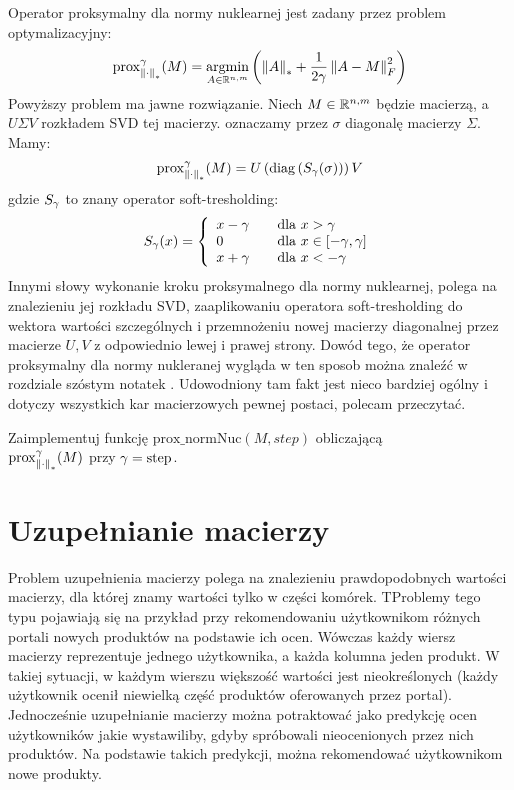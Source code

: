 \documentclass[10pt,a4paper,draft]{report}
\begin{document}
Operator proksymalny dla normy nuklearnej jest zadany przez problem optymalizacyjny:
\[
\prox_{\normNuc{\cdot}}^{\step}(M) = \argminl\limits_{A \in \rset^{n,m}} \left(\normNuc{A} + \frac{1}{2\step} \norm{A - M}_F^2 \right)
\]
Powyższy problem ma jawne rozwiązanie. Niech $M \in \mathbb{R}^{n,m}$ będzie macierzą, a $U \Sigma V$ rozkładem SVD tej macierzy. oznaczamy przez $\sigma$ diagonalę macierzy $\Sigma$. Mamy:
\[
\operatorname{prox}_{\left\Vert \cdot \right\Vert_{*}}^{\gamma}(M) = U \left( \operatorname{diag} \left(S_{\gamma}(\sigma) \right) \right) V
\]
gdzie $S_{\gamma}$ to znany operator soft-tresholding:
\[
S_{\gamma}(x) = \left\{ 
\begin{array}{lcl}
x - \gamma && \text{dla } x > \gamma \\
0 &&  \text{dla } x \in [-\gamma, \gamma] \\
x + \gamma && \text{dla } x < -\gamma
\end{array}
\right.
\]
Innymi słowy wykonanie kroku proksymalnego dla normy nuklearnej, polega na znalezieniu jej rozkładu SVD, zaaplikowaniu operatora soft-tresholding do wektora wartości szczególnych i przemnożeniu nowej macierzy diagonalnej przez macierze $U,V$ z odpowiednio lewej i prawej strony. Dowód tego, że operator proksymalny dla normy nukleranej wygląda w ten sposob można znaleźć w rozdziale szóstym notatek \cite{notesMIT}. Udowodniony tam fakt jest nieco bardziej ogólny i dotyczy wszystkich kar macierzowych pewnej postaci, polecam przeczytać.


\begin{problem} \label{prob:prob1} 
Zaimplementuj funkcję $\text{prox\_normNuc}(M, step)$ obliczającą  \\ $\operatorname{prox}_{\left\Vert \cdot \right\Vert_{*}}^{\gamma}(M)$ przy $\gamma = \text{step}$.
\end{problem}

\newpage
\section*{Uzupełnianie macierzy}
Problem uzupełnienia macierzy polega na znalezieniu prawdopodobnych wartości macierzy, dla której znamy wartości tylko w części komórek. TProblemy tego typu pojawiają się na przykład przy rekomendowaniu użytkownikom różnych portali nowych produktów na podstawie ich ocen. Wówczas każdy wiersz macierzy reprezentuje jednego użytkownika, a każda kolumna jeden produkt. W takiej sytuacji, w każdym wierszu większość wartości jest nieokreślonych (każdy użytkownik ocenił niewielką część produktów oferowanych przez portal). Jednocześnie uzupełnianie macierzy można potraktować jako predykcję ocen użytkowników jakie wystawiliby, gdyby spróbowali nieocenionych przez nich produktów. Na podstawie takich predykcji, można rekomendować użytkownikom nowe produkty.
\end{document}
